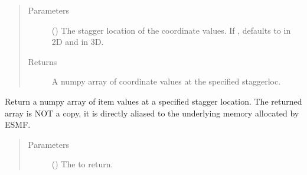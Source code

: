 \documentclass[letterpaper,10pt,english]{sphinxmanual}
\begin{document}
\begin{fulllineitems}
\begin{fulllineitems}
\begin{quote}\begin{description}
\item[{Parameters}] \leavevmode
{} ({\hyperref[\detokenize{StaggerLoc:ESMF.api.constants.StaggerLoc}]{}}) \textendash{} The stagger location of the coordinate
values. If , defaults to
{\hyperref[\detokenize{StaggerLoc:ESMF.api.constants.StaggerLoc.CENTER}]{}}
in 2D and {\hyperref[\detokenize{StaggerLoc:ESMF.api.constants.StaggerLoc.CENTER_VCENTER}]{}} in
3D.

\item[{Returns}] \leavevmode
A numpy array of coordinate values at the specified staggerloc.

\end{description}\end{quote}

\end{fulllineitems}


\begin{fulllineitems}
\label{\detokenize{grid:ESMF.api.grid.Grid.get_item}}
Return a numpy array of item values at a specified stagger
location.  The returned array is NOT a copy, it is
directly aliased to the underlying memory allocated by ESMF.

\begin{quote}\begin{description}
\item[{Parameters}] \leavevmode
{} ({\hyperref[\detokenize{GridItem:ESMF.api.constants.GridItem}]{}}) \textendash{} The {\hyperref[\detokenize{GridItem:ESMF.api.constants.GridItem}]{}} to
return.

\end{description}\end{quote}


\end{fulllineitems}
\end{fulllineitems}
\end{document}
